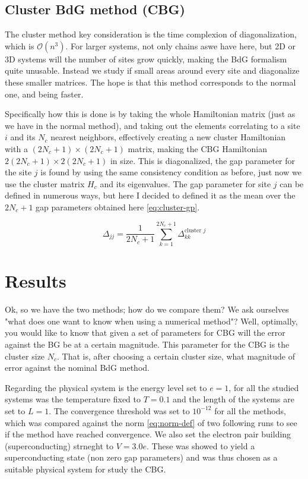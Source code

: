 \documentclass[11pt]{article}
\begin{document}
\subsection{Cluster BdG method (CBG) }

The cluster method key consideration is the time complexion of diagonalization, which is $\mathcal{O}(n^3)$. For larger systems, not only chains aswe have here, but 2D or 3D systems will the number of sites grow quickly, making the BdG formalism quite unusable. Instead we study if small areas around every site and diagonalize these smaller matrices. The hope is that this method corresponds to the normal one, and being faster. 

Specifically how this is done is by taking the whole Hamiltonian matrix (just as we have in the normal method), and taking out the elements correlating to a site $i$ and its $N_c$ nearest neighbors, effectively creating a new cluster Hamiltonian with a $(2N_c + 1)\times (2N_c + 1)$ matrix, making the CBG Hamiltonian $2(2N_c + 1) \times 2(2N_c + 1)$ in size. This is diagonalized, the gap parameter for the site $j$ is found by using the same consistency condition as before, just now we use the cluster matrix $H_c$ and its eigenvalues. The gap parameter for site $j$ can be defined in numerous ways, but here I decided to defined it as the mean over the $2N_c + 1$ gap parameters obtained here \eqref{eq:cluster-gp}.

\begin{equation}\label{eq:cluster-gp}
  \Delta_{jj} = \frac{1}{2N_c + 1} \sum_{k=1}^{2N_c+1} \Delta^{\text{cluster } j}_{kk}
\end{equation}

\section{Results}\label{sec:results}


Ok, so we have the two methods; how do we compare them? We ask ourselves "what does one want to know when using a numerical method"? Well, optimally, you would like to know that given a set of parameters for CBG will the error against the BG be at a certain magnitude. This parameter for the CBG is the cluster size $N_c$. That is, after choosing a certain cluster size, what magnitude of error against the nominal BdG method. 

Regarding the physical system is the energy level set to $e = 1$, for all the studied systems was the temperature fixed to $T = 0.1$ and the length of the systems are set to $L=1$. The convergence threshold was set to $10^{-12}$ for all the methods, which was compared against the norm \eqref{eq:norm-def} of two following runs to see if the method have reached convergence. We also set the electron pair building (superconducting) strneght to $V = 3.0 e$. These was showed to yield a superconducting state (non zero gap parameters) and was thus chosen as a suitable physical system for study the CBG. 
\end{document}
